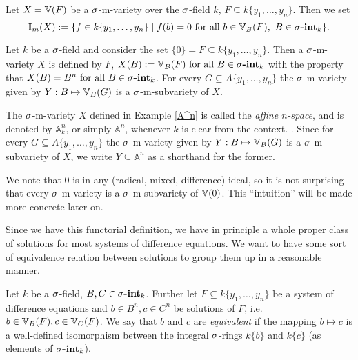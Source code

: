 \begin{defn}\label{defnI}
Let $X = \mathbb{V}(F)$ be a $\sigma$-m-variety over the $\sigma$-field $k$, $F \subseteq k\{y_1,\ldots,y_n\}$. Then we set $$\mathbb{I}_m(X):= \{ f \in k\{y_1,\ldots,y_n\} \mid f(b) = 0 \text{ for all } b \in \mathbb{V}_B(F), ~ B \in \sigma\text{{\normalfont\textbf{-int}}}_k \}.$$ 
\end{defn}

\begin{ex}\label{A^n}
Let $k$ be a $\sigma$-field and consider the set $\{ 0 \} = F \subseteq k\{y_1,\ldots,y_n\}$. Then a $\sigma$-m-variety $X$ is defined by $F$, $X(B) := \mathbb{V}_B(F) \text{ for all } B \in \sigma\text{{\normalfont\textbf{-int}}}_k$ with the property that $X(B) = B^n \text{ for all } B \in \sigma\text{{\normalfont\textbf{-int}}}_k$.
For every $G \subseteq A\{y_1,\ldots,y_n\}$ the $\sigma$-m-variety given by $Y: B \mapsto \mathbb{V}_B(G)$ is a $\sigma$-m-subvariety of $X$. 
\end{ex}

\begin{defn}\label{defA^n}
The $\sigma$-m-variety $X$ defined in Example \ref{A^n} is called the \emph{affine $n$-space}, and is denoted by $\mathbb{A}^n_k$, 
or simply $\mathbb{A}^n$, whenever $k$ is clear from the context.   .
Since for every $G \subseteq A\{y_1,\ldots,y_n\}$ the $\sigma$-m-variety given by $Y: B \mapsto \mathbb{V}_B(G)$ is a $\sigma$-m-subvariety of $X$, 
we write $Y \subseteq \mathbb{A}^n$ as a shorthand for the former.
\end{defn}

We note that $0$ is in any (radical, mixed, difference) ideal, so it is not surprising that every $\sigma$-m-variety is a $\sigma$-m-subvariety of $\mathbb{V}(0)$. This ``intuition'' will be made more concrete later on.

Since we have this functorial definition, we have in principle a whole proper class of solutions for most systems of difference equations. 
We want to have some sort of equivalence relation between solutions to group them up in a reasonable manner.

\begin{defn}\label{equivsols}
Let $k$ be a $\sigma$-field, $B,C \in \sigma\text{{\normalfont\textbf{-int}}}_k$. Further let $F \subseteq k\{y_1,\ldots,y_n\}$ be a system of difference equations and $b \in B^n, c \in C^n$ be solutions of $F$, i.e. $b \in \mathbb{V}_B(F), c \in \mathbb{V}_C(F)$.
We say that $b$ and $c$ are \emph{equivalent} if the mapping $b \mapsto c$ is a well-defined isomorphism between the integral $\sigma$-rings $k\{b\}$ and $k\{c\}$  (as elements of $\sigma\text{{\normalfont\textbf{-int}}}_k$). 
\end{defn}

